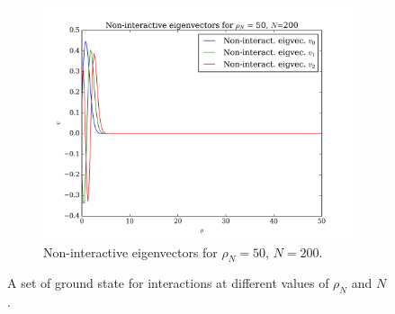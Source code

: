 \documentclass[11pt,a4paper,notitlepage]{article}
\begin{document}
\begin{figure}[H]
\begin{subfigure}[t]{0.45\textwidth}
 		\includegraphics[scale=0.40]{../non_interacting_eigvec_plot_rhoN=50_N=200.png}
 		\caption{Non-interactive eigenvectors for $\rho_N = 50$, $N = 200$.}\label{fig:eigvecs-non-interact-50-200}
 \end{subfigure}
 	\caption{A set of ground state for interactions at different values of $\rho_N$ and $N$.}\label{fig:eigvecs-non-interact}
 \end{figure}
\end{document}
